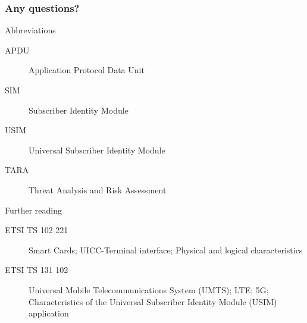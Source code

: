 \documentclass[10pt]{beamer}
\renewcommand{\section}[1]{\frametitle{#1}}
\begin{document}
    \begin{frame}
        \section{Any questions?}

        \begin{block}{Abbreviations}
            \begin{description}
                \item[APDU] Application Protocol Data Unit
				\item[SIM] Subscriber Identity Module
				\item[USIM] Universal Subscriber Identity Module
				\item[TARA] Threat Analysis and Risk Assessment
            \end{description}
        \end{block}

        \begin{block}{Further reading}
            \begin{description}
                \item[ETSI TS 102 221] Smart Cards; UICC-Terminal interface; Physical and logical characteristics
				\item[ETSI TS 131 102] Universal Mobile Telecommunications System (UMTS); LTE; 5G; Characteristics of the Universal Subscriber Identity Module (USIM) application
            \end{description}
        \end{block}
    \end{frame}
\end{document}
